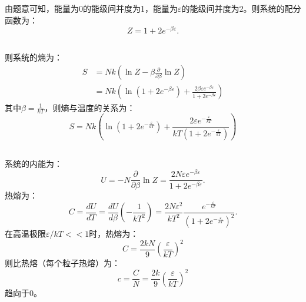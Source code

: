 \documentclass[a4paper,12pt]{article}
\begin{document}
\section{}
由题意可知，能量为$0$的能级间并度为1，能量为$\varepsilon$的能级间并度为2。则系统的配分函数为：
\begin{equation}\nonumber
	Z = 1+2e^{-\beta\varepsilon}.
\end{equation}
\subsection{}
则系统的熵为：
\begin{equation}\nonumber
\begin{aligned}
	S &= Nk\left( \ln Z - \beta\frac{\partial}{\partial \beta}\ln Z \right) \\ 
	&= Nk\left( \ln\left( 1+2e^{-\beta\varepsilon} \right) + \frac{2\beta\varepsilon e^{-\beta\varepsilon}}{1+2e^{-\beta\varepsilon}} \right) 
\end{aligned}
\end{equation}
其中$\beta = \frac{1}{kT}$，则熵与温度的关系为：
\begin{equation}\nonumber
	S = Nk\left( \ln\left( 1+2e^{-\frac{\varepsilon}{kT}} \right) + \frac{2\varepsilon e^{-\frac{\varepsilon}{kT}}}{kT(1+2e^{-\frac{\varepsilon}{kT}})} \right) 
\end{equation}
\subsection{}
系统的内能为：
\begin{equation}\nonumber
	U = -N\frac{\partial }{\partial \beta}\ln Z = \frac{2N\varepsilon e^{-\beta\varepsilon}}{1+2e^{-\beta\varepsilon}}.
\end{equation}
热熔为：
\begin{equation}\nonumber
	C = \frac{dU}{dT} = \frac{dU}{d\beta}\left(-\frac{1}{kT^2}\right) = \frac{2N\varepsilon^2}{kT^2}\frac{e^{-\frac{\varepsilon}{kT}}}{\left(1+2e^{-\frac{\varepsilon}{kT}}\right)^2}.
\end{equation}
在高温极限$\varepsilon/kT << 1$时，热熔为：
\begin{equation*}
	C = \frac{2kN}{9}\left( \frac{\varepsilon}{kT} \right)^2
\end{equation*}
则比热熔（每个粒子热熔）为：
\begin{equation}\nonumber
	c =\frac{C}{N} = \frac{2k}{9}\left( \frac{\varepsilon}{kT} \right)^2
\end{equation}
趋向于0。
\end{document}
